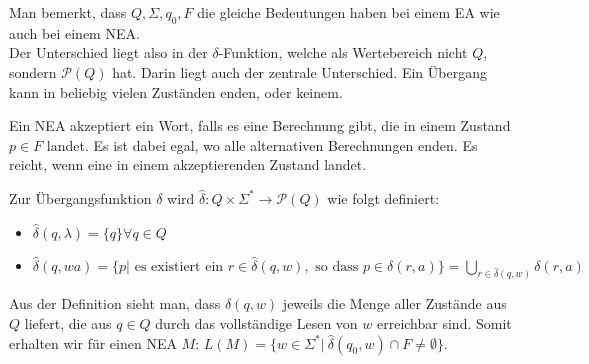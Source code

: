 Man bemerkt, dass $Q, \Sigma, q_0, F$ die gleiche Bedeutungen haben bei einem EA wie auch bei einem NEA.\\

Der Unterschied liegt also in der $\delta$-Funktion, welche als Wertebereich nicht $Q$, sondern $\mathcal{P}(Q)$ hat. Darin liegt auch der zentrale Unterschied. Ein Übergang kann in beliebig vielen Zuständen enden, oder keinem.

Ein NEA akzeptiert ein Wort, falls es eine Berechnung gibt, die in einem Zustand $p \in F$ landet. Es ist dabei egal, wo alle alternativen Berechnungen enden. Es reicht, wenn eine in einem akzeptierenden Zustand landet.\\

\begin{definition}
Zur Übergangsfunktion $\delta$ wird $\hat\delta: Q \times \Sigma^* \to \mathcal{P}(Q)$ wie folgt definiert:
\begin{itemize}
  \item $\hat\delta(q, \lambda) = \{q\} \forall q \in Q$
  \item $\hat\delta(q, wa) = \{p | \text{ es existiert ein } r \in \hat\delta(q, w), \text{ so dass } p \in \delta(r, a)\} = \bigcup_{r \in \hat\delta(q, w)} \delta(r, a)$\\
\end{itemize}

\end{definition}

Aus der Definition sieht man, dass $\delta(q, w)$ jeweils die Menge aller Zustände aus $Q$ liefert, die aus $q \in Q$ durch das vollständige Lesen von $w$ erreichbar sind. Somit erhalten wir für einen NEA $M$: $L(M) = \{ w \in \Sigma^* |\ \hat\delta(q_0, w) \cap F \not= \emptyset \}$.

